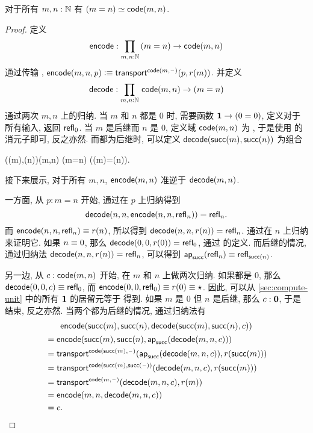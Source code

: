 \begin{thm}\label{thm:path-nat}
  对于所有 $m,n:\mathbb{N}$ 有 $(m=n) \simeq \mathsf{code}(m,n)$.
\end{thm}
\begin{proof}
  定义
  \[ \encode : \prd{m,n:\N} (m=n) \to \code(m,n) \]
  通过传输 , $\mathsf{encode}(m,n,p) \vcentcolon\equiv \mathsf{transport}^{\mathsf{code}(m,{\mathord{\hspace{1pt}\text{--}\hspace{1pt}}})}(p,r(m))$.
  并定义
  \[ \decode : \prd{m,n:\N} \code(m,n) \to (m=n) \]
  通过两次 $m,n$ 上的归纳.
  当 $m$ 和 $n$ 都是 $0$ 时, 需要函数 $\mathbf{1} \to (0=0)$, 定义对于所有输入, 返回 $\mathsf{refl}_{0}$.
  当 $m$ 是后继而 $n$ 是 $0$, 定义域 $\mathsf{code}(m,n)$ 为 \emptyt, 于是使用 \emptyt 的消元子即可, 反之亦然.
  而都为后继时, 可以定义 $\mathsf{decode}(\mathsf{succ}(m),\mathsf{succ}(n))$ 为组合
  \begin{narrowmultline*}
    \code(\suc(m),\suc(n))\jdeq\code(m,n)
     \narrowbreak
    (m=n)
    \xrightarrow{\apfunc{\suc}}
    (\suc(m)=\suc(n)).
  \end{narrowmultline*}
  接下来展示, 对于所有 $m,n$, $\mathsf{encode}(m,n)$ 准逆于 $\mathsf{decode}(m,n)$.

  一方面, 从 $p:m=n$ 开始, 通过在 $p$ 上归纳得到
  \[\mathsf{decode}(n,n,\mathsf{encode}(n,n,\mathsf{refl}_{n}))=\mathsf{refl}_{n}.\]
  而 $\mathsf{encode}(n,n,\mathsf{refl}_{n}) \equiv r(n)$, 所以得到 $\mathsf{decode}(n,n,r(n)) =\mathsf{refl}_{n}$.
  通过在 $n$ 上归纳来证明它.
  如果 $n\equiv 0$, 那么 $\mathsf{decode}(0,0,r(0)) =\mathsf{refl}_{0}$, 通过 \decode 的定义.
  而后继的情况, 通过归纳法 $\mathsf{decode}(n,n,r(n)) = \mathsf{refl}_{n}$, 可以得到 $\mathsf{ap}_{\mathsf{succ}}(\mathsf{refl}_{n}) \equiv \mathsf{refl}_{\mathsf{succ}(n)}$.

  另一边, 从 $c:\mathsf{code}(m,n)$ 开始, 在 $m$ 和 $n$ 上做两次归纳.
  如果都是 $0$, 那么 $\mathsf{decode}(0,0,c) \equiv \mathsf{refl}_{0}$, 而 $\mathsf{encode}(0,0,\mathsf{refl}_{0})\equiv r(0) \equiv \star$.
  因此, 可以从 \cref{sec:compute-unit} 中的所有 $\mathbf{1}$ 的居留元等于 \ttt 得到.
  如果 $m$ 是 $0$ 但 $n$ 是后继, 那么 $c:\mathbf{0}$, 于是结束, 反之亦然.
  当两个都为后继的情况, 通过归纳法有
  \begin{multline*}
    \mathsf{encode}(\mathsf{succ}(m),\mathsf{succ}(n),\mathsf{decode}(\mathsf{succ}(m),\mathsf{succ}(n),c))\\
    \begin{aligned}
    &= \mathsf{encode}(\mathsf{succ}(m),\mathsf{succ}(n),\mathsf{ap}_{\mathsf{succ}}(\mathsf{decode}(m,n,c)))\\
    &= \mathsf{transport}^{\mathsf{code}(\mathsf{succ}(m),{\mathord{\hspace{1pt}\text{--}\hspace{1pt}}})}(\mathsf{ap}_{\mathsf{succ}}(\mathsf{decode}(m,n,c)),r(\mathsf{succ}(m)))\\
    &= \mathsf{transport}^{\mathsf{code}(\mathsf{succ}(m),\mathsf{succ}({\mathord{\hspace{1pt}\text{--}\hspace{1pt}}}))}(\mathsf{decode}(m,n,c),r(\mathsf{succ}(m)))\\
    &= \mathsf{transport}^{\mathsf{code}(m,{\mathord{\hspace{1pt}\text{--}\hspace{1pt}}})}(\mathsf{decode}(m,n,c),r(m))\\
    &= \mathsf{encode}(m,n,\mathsf{decode}(m,n,c))\\
    &= c.
  \end{aligned}
  \end{multline*}
\end{proof}

